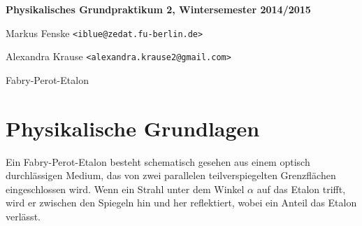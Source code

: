 \documentclass[a4paper,german,12pt,smallheadings]{scrartcl}
\begin{document}
\begin{titlepage}

\end{titlepage}

\allowdisplaybreaks %
\begin{center}
\bfseries %
\sffamily %
\vspace{-40pt}
Physikalisches Grundpraktikum 2, Wintersemester 2014/2015

Markus Fenske \texttt{<iblue@zedat.fu-berlin.de>}

Alexandra Krause \texttt{<alexandra.krause2@gmail.com>}

Fabry-Perot-Etalon
\vspace{-10pt}
\end{center}

\section{Physikalische Grundlagen}

Ein Fabry-Perot-Etalon besteht schematisch gesehen aus einem optisch
durchlässigen Medium, das von zwei parallelen teilverspiegelten Grenzflächen
eingeschlossen wird. Wenn ein Strahl unter dem Winkel $\alpha$ auf das Etalon
trifft, wird er zwischen den Spiegeln hin und her reflektiert, wobei ein Anteil
das Etalon verlässt.
\end{document}
